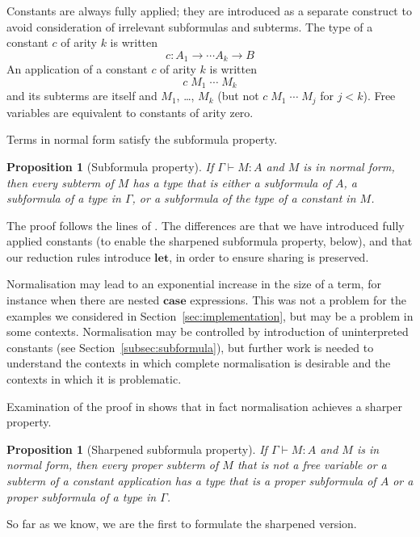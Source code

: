 \documentclass[authoryear,9pt]{sigplanconf}
\newtheorem{proposition}[theorem]{Proposition}
\newcommand{\app}{\;}
\begin{document}
Constants are always fully applied; they are introduced as a
separate construct to avoid consideration of irrelevant subformulas
and subterms.
The type of a constant $c$ of arity $k$ is written
\[
c : A_1 \to \cdots A_k \to B
\]
An application of a constant $c$ of arity $k$ is written
\[
c \app M_1 \app \cdots \app M_k
\]
and its subterms are itself and $M_1$, \ldots, $M_k$
(but not $c \app M_1 \app \cdots \app M_j$ for $j < k$).
Free variables are equivalent to constants of arity zero.

Terms in normal form satisfy the subformula property.

\begin{proposition}[Subformula property]
\label{prop:subformula}
If $\Gamma \vdash M:A$ and $M$ is in normal form,
then every subterm of $M$ has a type that is either a subformula of $A$,
a subformula of a type in $\Gamma$, or a subformula of the type
of a constant in $M$.
\end{proposition}
The proof follows the lines of \citet{Prawitz-1965}.
The differences are that we have introduced fully applied constants
(to enable the sharpened subformula property, below), and that our
reduction rules introduce \ensuremath{\mathbf{let}}, in order to ensure sharing is preserved.

Normalisation may lead to an exponential increase in the size
of a term, for instance when there are nested \ensuremath{\mathbf{case}} expressions. This
was not a problem for the examples we considered in
Section~\ref{sec:implementation}, but may be a problem in some
contexts. Normalisation may be controlled by introduction of
uninterpreted constants (see Section~\ref{subsec:subformula}),
but further work is needed to understand the contexts in which
complete normalisation is
desirable and the contexts in which it is problematic.

Examination of the proof in \citet{Prawitz-1965} shows that in fact
normalisation achieves a sharper property.
\begin{proposition}[Sharpened subformula property]
\label{prop:sharpened}
If $\Gamma \vdash M:A$ and $M$ is in normal form, then every proper
subterm of $M$ that is not a free variable or a subterm of a constant
application has a type that is a proper subformula of $A$ or a proper
subformula of a type in $\Gamma$.
\end{proposition}
So far as we know, we are the first to formulate the sharpened version.
\end{document}
